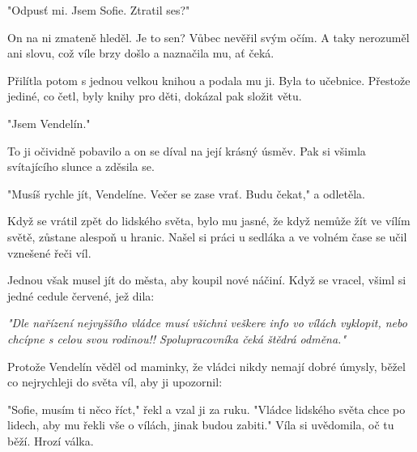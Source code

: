 \documentclass{fkssolpub}
\begin{document}
"Odpusť mi. Jsem Sofie. Ztratil ses?"

On na ni zmateně hleděl. Je to sen? Vůbec nevěřil svým očím. A taky
nerozuměl ani slovu, což víle brzy došlo a naznačila mu, ať čeká.

Přilítla potom s jednou velkou knihou a podala mu ji. Byla to učebnice.
Přestože jediné, co četl, byly knihy pro děti, dokázal pak složit
větu.

"Jsem Vendelín."

To ji očividně pobavilo a on se díval na její krásný úsměv. Pak
si všimla svítajícího slunce a zděsila se.

"Musíš rychle jít, Vendelíne. Večer se zase vrať. Budu čekat," a 
odletěla.

Když se vrátil zpět do lidského světa, bylo mu jasné, že když
nemůže žít ve vílím světě, zůstane alespoň u hranic. Našel si práci u
sedláka a ve volném čase se učil vznešené řeči víl.

Jednou však musel jít do města, aby koupil nové náčiní. Když se vracel, 
všiml si jedné cedule červené, jež dila: 

\textit{"Dle nařízení nejvyššího vládce musí všichni veškere info vo
vílách vyklopit, nebo chcípne s celou svou rodinou!! Spolupracovníka
čeká štědrá odměna."}

Protože Vendelín věděl od maminky, že vládci nikdy nemají dobré úmysly,
běžel co nejrychleji do světa víl, aby ji upozornil:

"Sofie, musím ti něco říct," řekl a vzal ji za ruku. "Vládce lidského
světa chce po lidech, aby mu řekli vše o vílách, jinak budou zabiti."
Víla si uvědomila, oč tu běží. Hrozí válka.
\end{document}

